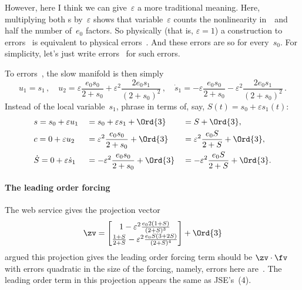 \documentclass[12pt,a5paper]{article}
\begin{document}
However, here I think we can give~\(\varepsilon\) a more traditional meaning.  Here, multiplying both \ode{}s by~\(\varepsilon\) shows that variable~\(\varepsilon\) counts the nonlinearity in~\uv\ and half the number of~\(e_0\) factors. 
So physically (that is, \(\varepsilon=1\)) a construction to errors~ is equivalent to physical errors~.  And these errors are so for every~\(s_0\).  For simplicity, let's just write errors~ for such errors.

To errors~, the slow manifold is then simply
\begin{equation}
u_1=s_1\,, \quad
u_2=\varepsilon \frac{e_0s_0}{2+s_0} 
+\varepsilon^2\frac{2e_0s_1}{(2+s_0)^2}\,, \quad
\dot s_1=-\varepsilon \frac{e_0s_0}{2+s_0}
-\varepsilon^2\frac{2e_0s_1}{(2+s_0)^2} \,.
\end{equation}
Instead of the local variable~\(s_1\), phrase in terms of, say, \(S(t)=s_0+\varepsilon s_1(t)\):
\begin{subequations}\label{eqs:}%
\begin{align}&
s=s_0+\varepsilon u_1&&=s_0+\varepsilon s_1+\Ord{3}
&&=S+\Ord{3},
\\&
c=0+\varepsilon u_2&&=\varepsilon^2 \frac{e_0s_0}{2+s_0}+\Ord{3}
&&=\varepsilon^2 \frac{e_0S}{2+S}+\Ord{3},
\\&
\dot S=0+\varepsilon \dot s_1&&=-\varepsilon^2 \frac{e_0s_0}{2+s_0}+\Ord{3}
&&=-\varepsilon^2 \frac{e_0S}{2+S}+\Ord{3}.
\end{align}
\end{subequations}


\paragraph{The leading order forcing}
The web service \citep[based upon][]{Roberts97b} gives the projection vector
\begin{equation}
\zv=\begin{bmatrix} 1-\varepsilon^2 \frac {e_02(1+S)}{(2+S)^3} 
\\
\frac{1+S}{2+S} -\varepsilon^2 \frac {e_0S(3+2S)}{(2+S)^4}
\end{bmatrix} +\Ord{3}
\end{equation}
\cite{Roberts89b} argued this projection gives the leading order forcing term should be \(\zv\cdot\fv\) with errors quadratic in the size of the forcing, namely, errors here are~.  The leading order term in this projection appears the same as JSE's~(4).
\end{document}

